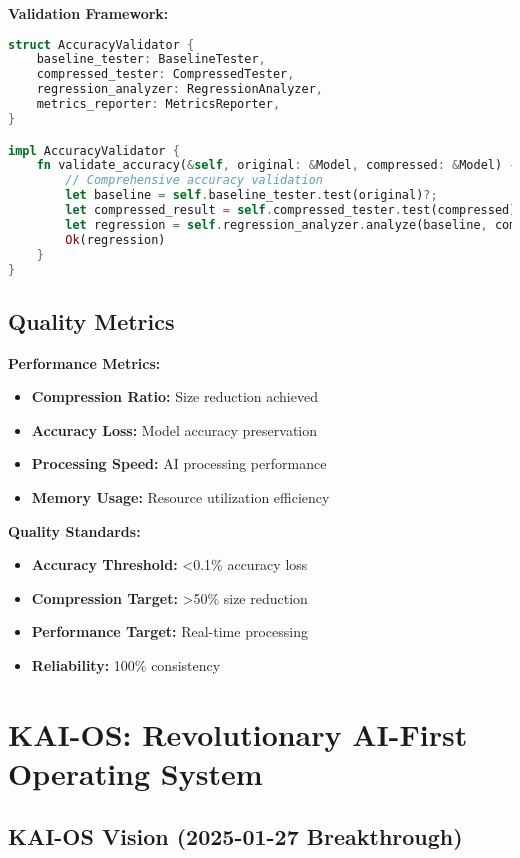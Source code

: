 \documentclass[12pt,a4paper]{article}
\begin{document}
\textbf{Validation Framework:}
\begin{lstlisting}[language=Rust, caption=Accuracy Validation]
struct AccuracyValidator {
    baseline_tester: BaselineTester,
    compressed_tester: CompressedTester,
    regression_analyzer: RegressionAnalyzer,
    metrics_reporter: MetricsReporter,
}

impl AccuracyValidator {
    fn validate_accuracy(&self, original: &Model, compressed: &Model) -> ValidationResult {
        // Comprehensive accuracy validation
        let baseline = self.baseline_tester.test(original)?;
        let compressed_result = self.compressed_tester.test(compressed)?;
        let regression = self.regression_analyzer.analyze(baseline, compressed_result)?;
        Ok(regression)
    }
}
\end{lstlisting}

\subsection{Quality Metrics}

\textbf{Performance Metrics:}
\begin{itemize}
    \item \textbf{Compression Ratio:} Size reduction achieved
    \item \textbf{Accuracy Loss:} Model accuracy preservation
    \item \textbf{Processing Speed:} AI processing performance
    \item \textbf{Memory Usage:} Resource utilization efficiency
\end{itemize}

\textbf{Quality Standards:}
\begin{itemize}
    \item \textbf{Accuracy Threshold:} <0.1\% accuracy loss
    \item \textbf{Compression Target:} >50\% size reduction
    \item \textbf{Performance Target:} Real-time processing
    \item \textbf{Reliability:} 100\% consistency
\end{itemize}

\section{KAI-OS: Revolutionary AI-First Operating System}

\subsection{KAI-OS Vision (2025-01-27 Breakthrough)}
\end{document}
